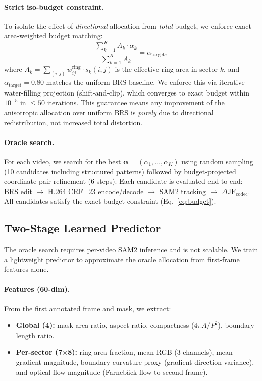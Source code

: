 \paragraph{Strict iso-budget constraint.}
To isolate the effect of \emph{directional} allocation from \emph{total} budget, we enforce exact area-weighted budget matching:
\begin{equation}
\label{eq:budget}
\frac{\sum_{k=1}^{K} A_k \cdot \alpha_k}{\sum_{k=1}^{K} A_k} = \alpha_\mathrm{target},
\end{equation}
where $A_k = \sum_{(i,j)} w^\mathrm{ring}_{ij} \cdot s_k(i,j)$ is the effective ring area in sector $k$, and $\alpha_\mathrm{target}{=}0.80$ matches the uniform BRS baseline.
We enforce this via iterative water-filling projection (shift-and-clip), which converges to exact budget within $10^{-5}$ in ${\leq}50$ iterations.
This guarantee means any improvement of the anisotropic allocation over uniform BRS is \emph{purely} due to directional redistribution, not increased total distortion.

\paragraph{Oracle search.}
For each video, we search for the best $\boldsymbol{\alpha}{=}(\alpha_1,\ldots,\alpha_K)$ using random sampling (10 candidates including structured patterns) followed by budget-projected coordinate-pair refinement (6 steps).
Each candidate is evaluated end-to-end: BRS edit $\to$ H.264 CRF=23 encode/decode $\to$ SAM2 tracking $\to$ $\Delta\mathrm{JF}_\mathrm{codec}$.
All candidates satisfy the exact budget constraint (Eq.~\ref{eq:budget}).

\subsection{Two-Stage Learned Predictor}
\label{subsec:predictor}

The oracle search requires per-video SAM2 inference and is not scalable.
We train a lightweight predictor to approximate the oracle allocation from first-frame features alone.

\paragraph{Features (60-dim).}
From the first annotated frame and mask, we extract:
\begin{itemize}
  \item \textbf{Global (4):} mask area ratio, aspect ratio, compactness ($4\pi A / P^2$), boundary length ratio.
  \item \textbf{Per-sector (7$\times$8):} ring area fraction, mean RGB (3 channels), mean gradient magnitude, boundary curvature proxy (gradient direction variance), and optical flow magnitude (Farneb\"ack flow to second frame).
\end{itemize}

